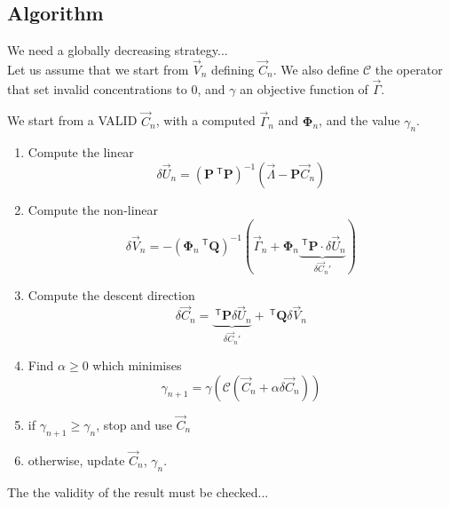 \documentclass[aps]{revtex4}
\newcommand{\mymat}[1]{\bm{#1}}
\newcommand{\mytrn}[1]{~^{\mathsf{T}}{#1}}
\begin{document}
\subsection{Algorithm}
We need a globally decreasing strategy...\\
Let us assume that we start from $\vec{V}_n$ defining $\vec{C}_n$.
We also define $\mathcal{C}$ the operator that set invalid concentrations to $0$, and $\gamma$ an
objective function of $\vec{\Gamma}$.

We start from a VALID $\vec{C}_n$, with a computed $\vec{\Gamma}_n$ and $\mymat{\Phi}_n$, and
the value $\gamma_n$.

\begin{enumerate}
\item Compute the linear 
	$$\delta\vec{U}_n = \left(\mymat{P}\mytrn{\mymat{P}}\right)^{-1} \left( \vec{\Lambda} - \mymat{P} \vec{C}_n \right)$$

\item Compute the non-linear
	$$\delta\vec{V}_n = - \left(\mymat{\Phi}_n\mytrn{\mymat{Q}}\right)^{-1}\left(\vec{\Gamma}_n+\mymat{\Phi}_n\underbrace{\mytrn{\mymat{P}}\cdot\delta\vec{U}_n}_{\delta\vec{C}_n'}\right)$$

\item Compute the descent direction 
$$
	\delta\vec{C}_n = \underbrace{\mytrn{\mymat{P}} \delta \vec{U}_n}_{\delta\vec{C}_n'} + \mytrn{\mymat{Q}} \delta\vec{V}_n
$$

\item Find $\alpha\geq0$ which minimises 
$$
	\gamma_{n+1} = \gamma\left( \mathcal{C}\left(\vec{C}_n + \alpha \delta\vec{C}_n\right)\right)
$$

\item if $\gamma_{n+1}\geq\gamma_n$, stop and use $\vec{C}_n$ 
\item otherwise, update $\vec{C}_n$, $\gamma_n$.
\end{enumerate}

The the validity of the result must be checked...
\end{document}
